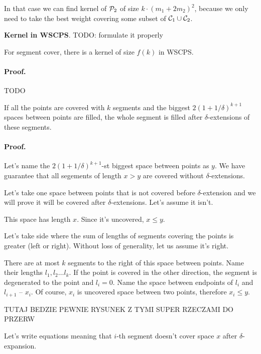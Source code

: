 In that case we can find kernel of $\mathcal{P}_2$ of size $k\cdot(m_1 + 2m_2)^2$,
because we only need to take the best weight covering some subset of $\mathcal{C}_1 \cup \mathcal{C}_2$.

\begin{lemma}
	\textbf{Kernel in WSCPS}.
	TODO: formulate it properly
	
	For segment cover, there is a kernel of size $f(k)$
	in WSCPS.
\end{lemma}
\paragraph{Proof.}
TODO

\begin{lemma}
	\label{covered_spaces_lemma}
	If all the points are covered with $k$ segments and
	the biggest $2(1 + 1/\delta)^{k+1}$ spaces between points
	are filled, the whole segment is filled after
	$\delta$-extensions of these segments.
\end{lemma}
\paragraph{Proof.}
	Let's name the $2(1 + 1/\delta)^{k+1}$-st biggest space
	between points as $y$.
	We have guarantee that all segements of length $x > y$
	are covered without $\delta$-extensions.
	
	Let's take one space between points that is not covered
	before $\delta$-extension and we will prove
	it will be covered after $\delta$-extensions.
	Let's assume it isn't.
	
	This space has length $x$. Since it's uncovered, $x \le y$.
	
	Let's take side where the sum of lengths of segments
	covering the points is greater (left or right).
	Without loss of generality, let us assume it's right.
	
	There are at most $k$ segments to the right of this space
	between points. Name their lengths $l_1, l_2 \ldots l_k$.
	If the point is covered in the other direction,
	the segment is degenerated to the point and $l_i = 0$.
	Name the space between endpoints of $l_i$ and $l_{i+1}$ -- $x_i$.
	Of course, $x_i$ is uncovered space between two points,
	therefore $x_i \le y$.
	
	TUTAJ BEDZIE PEWNIE RYSUNEK Z TYMI SUPER RZECZAMI DO PRZERW
	
	Let's write equations meaning that $i$-th segment
	doesn't cover space $x$ after $\delta$-expansion.
	
